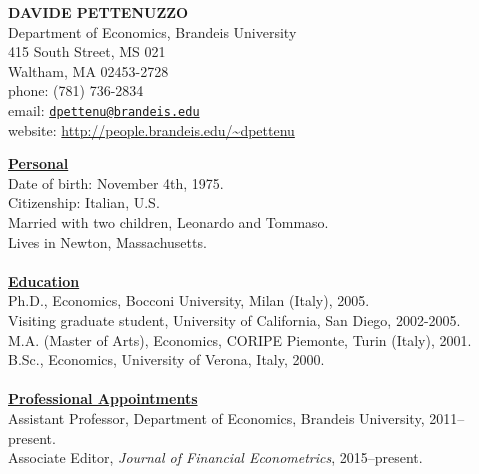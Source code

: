 \documentclass[12pt]{article}
\begin{document}
\begin{center}
\textbf{DAVIDE PETTENUZZO} \\
Department of Economics, Brandeis University \\
415 South Street, MS 021 \\
Waltham, MA 02453-2728 \\
phone: (781) 736-2834 \\
email: \href{mailto:dpettenu@brandeis.edu}{\nolinkurl{dpettenu@brandeis.edu}} \\
website: \url{http://people.brandeis.edu/~dpettenu} \\
\end{center}
\hline 
\bigskip

\underline{\textbf{Personal}}\\
Date of birth: November 4th, 1975. \\
Citizenship: Italian, U.S. \\
Married with two children, Leonardo and Tommaso. \\
Lives in Newton, Massachusetts. \\ \\ 
\underline{\textbf{Education}}\\
Ph.D., Economics, Bocconi University, Milan (Italy), 2005.\\
Visiting graduate student, University of California, San Diego, 2002-2005. \\
M.A. (Master of Arts), Economics, CORIPE Piemonte, Turin (Italy), 2001. \\
B.Sc., Economics, University of Verona, Italy, 2000.\\ \\
\underline{\textbf{Professional Appointments}}\\
Assistant Professor, Department of Economics, Brandeis University, 2011--present.\\
Associate Editor, \textit{Journal of Financial Econometrics}, 2015--present.
\end{document}
